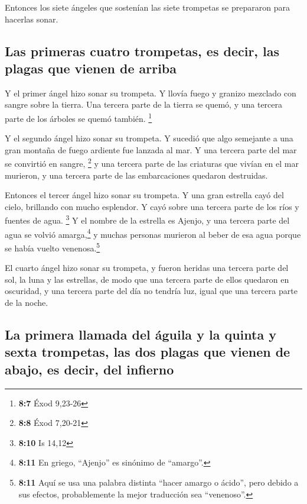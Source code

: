  Entonces los siete ángeles que sostenían las siete
trompetas se prepararon para hacerlas sonar.

\hypertarget{las-primeras-cuatro-trompetas-es-decir-las-plagas-que-vienen-de-arriba}{%
\subsection{Las primeras cuatro trompetas, es decir, las plagas que
vienen de
arriba}\label{las-primeras-cuatro-trompetas-es-decir-las-plagas-que-vienen-de-arriba}}

 Y el primer ángel hizo sonar su trompeta. Y llovía fuego
y granizo mezclado con sangre sobre la tierra. Una tercera parte de la
tierra se quemó, y una tercera parte de los árboles se quemó también.
\footnote{\textbf{8:7} Éxod 9,23-26}

 Y el segundo ángel hizo sonar su trompeta. Y sucedió que
algo semejante a una gran montaña de fuego ardiente fue lanzada al mar.
Y una tercera parte del mar se convirtió en sangre, \footnote{\textbf{8:8}
  Éxod 7,20-21}  y una tercera parte de las criaturas que
vivían en el mar murieron, y una tercera parte de las embarcaciones
quedaron destruidas.

 Entonces el tercer ángel hizo sonar su trompeta. Y una
gran estrella cayó del cielo, brillando con mucho esplendor. Y cayó
sobre una tercera parte de los ríos y fuentes de agua. \footnote{\textbf{8:10}
  Is 14,12}  Y el nombre de la estrella es Ajenjo, y una
tercera parte del agua se volvió amarga,\footnote{\textbf{8:11} En
  griego, ``Ajenjo'' es sinónimo de ``amargo''.} y muchas personas
murieron al beber de esa agua porque se había vuelto
venenosa.\footnote{\textbf{8:11} Aquí se usa una palabra distinta
  ``hacer amargo o ácido'', pero debido a sus efectos, probablemente la
  mejor traducción sea ``venenoso''.}

 El cuarto ángel hizo sonar su trompeta, y fueron heridas
una tercera parte del sol, la luna y las estrellas, de modo que una
tercera parte de ellos quedaron en oscuridad, y una tercera parte del
día no tendría luz, igual que una tercera parte de la noche.

\hypertarget{la-primera-llamada-del-uxe1guila-y-la-quinta-y-sexta-trompetas-las-dos-plagas-que-vienen-de-abajo-es-decir-del-infierno}{%
\subsection{La primera llamada del águila y la quinta y sexta trompetas,
las dos plagas que vienen de abajo, es decir, del
infierno}\label{la-primera-llamada-del-uxe1guila-y-la-quinta-y-sexta-trompetas-las-dos-plagas-que-vienen-de-abajo-es-decir-del-infierno}}

